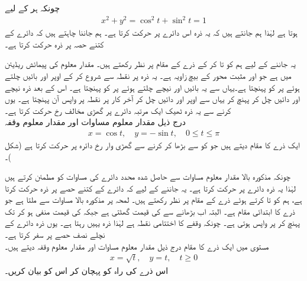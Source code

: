 چونکہ ہر  کے لیے
\begin{align*}
x^2+y^2=\cos^2t+\sin^2t=1
\end{align*}
ہوتا ہے لہٰذا ہم جانتے ہیں کہ یہ ذرہ اس دائرے پر حرکت کرتا ہے۔ ہم جاننا چاہتے ہیں کہ دائرے کے کتنے حصہ پر ذرہ حرکت کرتا ہے۔

یہ جاننے کے لیے ہم  کو  تا  کر کے ذرے کے مقام پر نظر رکھتے ہیں۔ مقدار معلوم  کی پیمائش  ریڈیئن میں ہے  جو  اور مثبت محور  کے بیچ  زاویہ ہے۔ یہ ذرہ  پر نقطہ  سے شروع  کر کے اوپر اور بائیں چلتے ہوئے  پر    کو پہنچتا ہے۔یہاں سے یہ بائیں اور نیچے چلتے ہوئے  پر    کو پہنچتا ہے۔ اس کے بعد ذرہ نیچے اور دائیں چل کر  پہنچ کر یہاں سے اوپر اور دائیں چل کر آخر کار  پر نقطہ  پر واپس آن پہنچتا ہے۔ یوں  کرنے سے یہ ذرہ ٹھیک ایک مرتبہ  دائرے پر گھڑی   مخالف رخ  حرکت کرتا  ہے۔
\\
درج ذیل مقدار معلوم مساوات اور مقدار معلوم وقفہ
\begin{align*}
x=\cos t,\quad y=-\sin t,\quad 0\le t\le \pi
\end{align*}
ایک ذرے کا مقام دیتے ہیں جو  کو  سے بڑھا کر  کرنے سے   گھڑی وار  رخ دائرہ  پر حرکت کرتا ہے (شکل )۔

چونکہ مذکورہ بالا مقدار معلوم مساوات سے حاصل  شدہ محدد دائرے کی مساوات کو مطمئن کرتے ہیں لہٰذا یہ ذرہ دائرے پر حرکت کرتا ہے۔ یہ جاننے کے لیے کہ دائرے کے کتنے حصے پر ذرہ حرکت کرتا ہے، ہم  کو  تا  کرتے ہوئے ذرے  کے مقام پر نظر رکھتے ہیں۔ لمحہ  پر مذکورہ بالا مساوات سے  ملتا ہے جو ذرے کا ابتدائی مقام ہے۔ البتہ اب  بڑھانے سے  کی قیمت گھٹتی ہے جبکہ  کی قیمت منفی ہو کر  تک پہنچ کر  پر واپس  ہوتی ہے۔ چونکہ  وقفے کا اختتامی نقطہ ہے لہٰذا ذرہ یہیں رہتا ہے۔ یوں ذرہ دائرے کے نچلے نصف حصے پر سفر کرتا ہے۔ 
\\
مستوی  میں ایک ذرے کا مقام  درج ذیل مقدار معلوم  مساوات اور مقدار معلوم وقفہ دیتے ہیں۔
\begin{align*}
x=\sqrt{t},\quad y=t,\quad t\ge 0
\end{align*}
اس ذرے کی راہ کو پہچان کر اس کو بیان کریں۔

